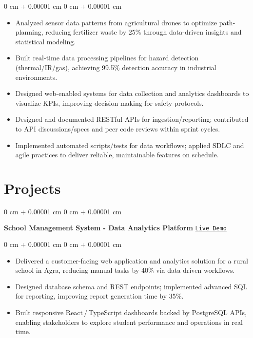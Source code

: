 \documentclass[10pt, letterpaper]{article}
\newenvironment{highlights}{ \begin{itemize}[ topsep=0.10 cm, parsep=0.10 cm, partopsep=0pt,
itemsep=0pt, leftmargin=0 cm + 10pt ] }{ \end{itemize} } %
\newenvironment{onecolentry}{ \begin{adjustwidth}{ 0 cm + 0.00001 cm }{ 0 cm + 0.00001 cm }
}{ \end{adjustwidth} } %
\begin{document}
\begin{onecolentry}
	\begin{highlights}
	\vspace{0.10 cm}
		\item Analyzed sensor data patterns from agricultural drones to optimize path-planning, reducing fertilizer waste by 25\% through data-driven insights and statistical modeling. \\
		\item Built real-time data processing pipelines for hazard detection (thermal/IR/gas), achieving 99.5\% detection accuracy in industrial environments. \\
		\item Designed web-enabled systems for data collection and analytics dashboards to visualize KPIs, improving decision-making for safety protocols. \\
		\item Designed and documented RESTful APIs for ingestion/reporting; contributed to API discussions/specs and peer code reviews within sprint cycles. \\
		\item Implemented automated scripts/tests for data workflows; applied SDLC and agile practices to deliver reliable, maintainable features on schedule.
	\end{highlights}
\end{onecolentry}

	\section{Projects}

\begin{onecolentry}
		\t\textbf{School Management System - Data Analytics Platform} \hfill \href{https://stgdconventschool.com}{\texttt{Live Demo}}
\end{onecolentry}

\begin{onecolentry}
	\begin{highlights}
		\vspace{0.1cm}
		\item Delivered a customer-facing web application and analytics solution for a rural school in Agra, reducing manual tasks by 40\% via data-driven workflows. \\
		\item Designed database schema and REST endpoints; implemented advanced SQL for reporting, improving report generation time by 35\%. \\
		\item Built responsive React\,/\,TypeScript dashboards backed by PostgreSQL APIs, enabling stakeholders to explore student performance and operations in real time.
	\end{highlights}
\end{onecolentry}
\end{document}
